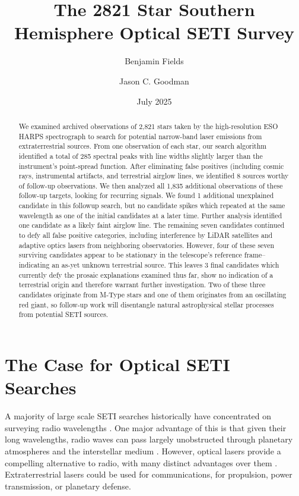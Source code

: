 \documentclass[twocolumn]{aastex701}
\begin{document}
\title{The 2821 Star Southern Hemisphere Optical SETI Survey}
\author[0009-0008-7048-916X]{Benjamin Fields} %

\author[0000-0002-6755-2710]{Jason C. Goodman}

\date{July 2025}

\begin{abstract}
We examined archived observations of 2,821 stars taken by the high-resolution ESO HARPS spectrograph to search for potential narrow-band laser emissions from extraterrestrial sources. From one observation of each star, our search algorithm identified a total of 285 spectral peaks with line widths slightly larger than the instrument's point-spread function.  After eliminating  false positives (including cosmic rays, instrumental artifacts, and terrestrial airglow lines, we identified 8 sources worthy of follow-up observations. We then analyzed all 1,835 additional observations of these follow-up targets, looking for recurring signals. We found 1 additional unexplained candidate in this followup search, but no candidate spikes which repeated at the same wavelength as one of the initial candidates at a later time.  Further analysis identified one candidate as a likely faint airglow line. The remaining seven candidates continued to defy all false positive categories, including interference by LiDAR satellites and adaptive optics lasers from neighboring observatories. However, four of these seven surviving candidates appear to be stationary in the telescope's reference frame--indicating an as-yet unknown terrestrial source. This leaves 3 final candidates which currently defy the prosaic explanations examined thus far, show no indication of a terrestrial origin and therefore warrant further investigation. Two of these three candidates originate from M-Type stars and one of them originates from an oscillating red giant, so follow-up work will disentangle natural astrophysical stellar processes from potential SETI sources.
\end{abstract}

\section{The Case for Optical SETI Searches}
A majority of large scale SETI searches historically have concentrated on surveying radio wavelengths \citep{Gray_2017,OZMAII,LAMPTON1992189,Price_2020,PeterMa,Wright_2018}. One major advantage of this is that given their long wavelengths, radio waves can pass largely unobstructed through planetary atmospheres and the interstellar medium \citep{COCCONI_MORRISON_1959}. However, optical lasers provide a compelling alternative to radio, with many distinct advantages over them \citep{caseforopticalseti}. Extraterrestrial lasers could be used for communications, for propulsion, power transmission, or planetary defense.  
\end{document}
